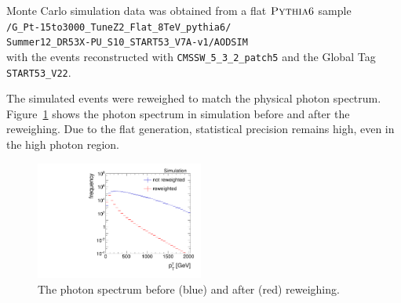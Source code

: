 \renewcommand{\arraystretch}{1.5}
\begin{table}[!hbt]
\centering
\caption{Single-photon data samples used for the resolution measurement with the contained integrated luminosity.}
\label{res:tab:datasets}
\end{table}  





Monte Carlo simulation data was obtained from a flat $\textsc{Pythia} 6$ sample\\ 
\texttt{/G\_Pt-15to3000\_TuneZ2\_Flat\_8TeV\_pythia6/}\\
\texttt{Summer12\_DR53X-PU\_S10\_START53\_V7A-v1/AODSIM}\\
with the events reconstructed with \texttt{CMSSW\_5\_3\_2\_patch5} and the Global Tag \texttt{START53\_V22}.

The simulated events were reweighed to match the physical photon \pt spectrum. 
\mbox{Figure \ref{res:fig:PhotonPtSpectrum}} shows the photon \pt spectrum in simulation before and after the reweighing. 
Due to the flat generation, statistical precision remains high, even in the high photon \pt region.
\begin{figure}[b]
  \centering
      \includegraphics[width=0.49\textwidth]{figures/resolution/eventSelection/PhotonPtComparison_reweighted.pdf} 
  \caption{The photon \pt spectrum before (blue) and after (red) reweighing.}  
  \label{res:fig:PhotonPtSpectrum}
\end{figure}

